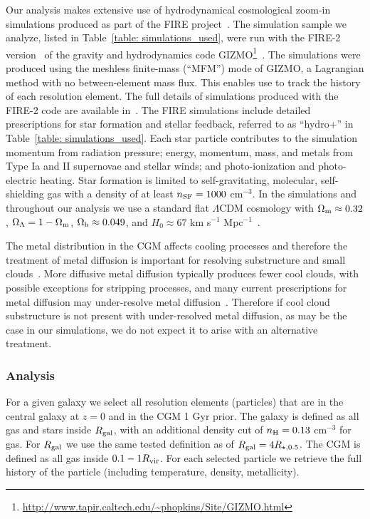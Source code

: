 \documentclass[fleqn,usenatbib]{mnras}
\begin{document}
Our analysis makes extensive use of hydrodynamical cosmological zoom-in simulations produced as part of the FIRE project~\citep{Hopkins2014}.
The simulation sample we analyze, listed in Table~\ref{table: simulations_used}, were run with the FIRE-2 version~\citep{Hopkins2018b} of the gravity and hydrodynamics code \textsc{GIZMO}\footnote{\url{http://www.tapir.caltech.edu/\~phopkins/Site/GIZMO.html}}~\citep{Hopkins2015}.
The simulations were produced using the meshless finite-mass (``MFM'') mode of \textsc{GIZMO}, a Lagrangian method with no between-element mass flux.
This enables use to track the history of each resolution element.
The full details of simulations produced with the FIRE-2 code are available in~\cite{Hopkins2018b}.
The FIRE simulations include detailed prescriptions for star formation and stellar feedback, referred to as ``hydro+'' in Table~\ref{table: simulations_used}.
Each star particle contributes to the simulation momentum from radiation pressure; energy, momentum, mass, and metals from Type Ia and II supernovae and stellar winds; and photo-ionization and photo-electric heating.
Star formation is limited to self-gravitating, molecular, self-shielding gas with a density of at least $n_{\rm SF} = 1000$ cm$^{-3}$.
In the simulations and throughout our analysis we use a standard flat $\Lambda$CDM cosmology with $\Omega_{\rm m }\approx 0.32$, $\Omega_{\Lambda}=1-\Omega_{\rm m}$, $\Omega_{\rm b} \approx 0.049$, and $H_{0} \approx 67$ km s$^{-1}$ Mpc$^{-1}$~\citep[e.g.,][]{PlanckCollaboration2018}.

The metal distribution in the CGM affects cooling processes and therefore the treatment of metal diffusion is important for resolving substructure and small clouds~\citep{rennehan2021}.
More diffusive metal diffusion typically produces fewer cool clouds, with possible exceptions for stripping processes, and many current prescriptions for metal diffusion may under-resolve metal diffusion~\citep[e.g.][]{rennehan2019, rennehan2021}.
Therefore if cool cloud substructure is not present with under-resolved metal diffusion, as may be the case in our simulations, we do not expect it to arise with an alternative treatment.

\subsubsection{Analysis}
\label{s: methods -- analysis}

For a given galaxy we select all resolution elements (particles) that are in the central galaxy at $z=0$ and in the CGM 1 Gyr prior.
The galaxy is defined as all gas and stars inside $R_{\rm gal}$, with an additional density cut of $n_{\rm H} = 0.13$ cm$^{-3}$ for gas.
For $R_{\rm gal}$ we use the same tested definition as \cite{Hafen2019, Hafen2020} of $R_{\rm gal} = 4 R_{\star,0.5}$.
The CGM is defined as all gas inside $0.1 -1 R_{\rm vir}$.
For each selected particle we retrieve the full history of the particle (including temperature, density, metallicity).
\end{document}
